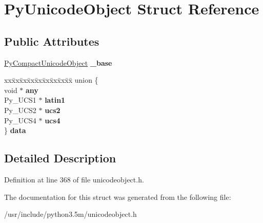 \hypertarget{structPyUnicodeObject}{}\section{Py\+Unicode\+Object Struct Reference}
\label{structPyUnicodeObject}
\subsection*{Public Attributes}
\begin{DoxyCompactItemize}
\item 
\hyperlink{structPyCompactUnicodeObject}{Py\+Compact\+Unicode\+Object} {\bfseries \+\_\+base}\hypertarget{structPyUnicodeObject_a857593a36f067fb323043bc45a9bebfd}{}\label{structPyUnicodeObject_a857593a36f067fb323043bc45a9bebfd}

\item 
\begin{tabbing}
xx\=xx\=xx\=xx\=xx\=xx\=xx\=xx\=xx\=\kill
union \{\\
\>void $\ast$ {\bfseries any}\\
\>Py\_UCS1 $\ast$ {\bfseries latin1}\\
\>Py\_UCS2 $\ast$ {\bfseries ucs2}\\
\>Py\_UCS4 $\ast$ {\bfseries ucs4}\\
\} {\bfseries data}\hypertarget{structPyUnicodeObject_a4fbdbc548d97a1ee2333b1c3341cbe5e}{}\label{structPyUnicodeObject_a4fbdbc548d97a1ee2333b1c3341cbe5e}
\\

\end{tabbing}\end{DoxyCompactItemize}


\subsection{Detailed Description}


Definition at line 368 of file unicodeobject.\+h.



The documentation for this struct was generated from the following file\+:\begin{DoxyCompactItemize}
\item 
/usr/include/python3.\+5m/unicodeobject.\+h\end{DoxyCompactItemize}

